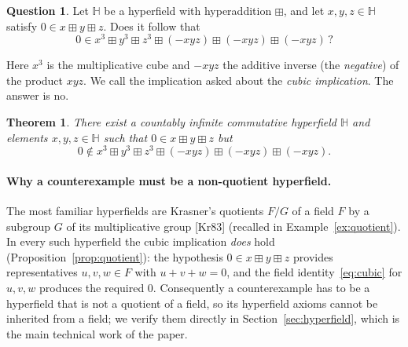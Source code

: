 \documentclass[12pt]{article}
\theoremstyle{plain}
\newtheorem{theorem}{Theorem}[section]
\theoremstyle{definition}
\newtheorem*{question}{Question}
\newcommand{\Hh}{\mathbb{H}}
\newcommand{\bp}{\boxplus}
\begin{document}
\begin{question}
Let $\Hh$ be a hyperfield with hyperaddition $\bp$, and let
$x,y,z\in\Hh$ satisfy $0\in x\bp y\bp z$.  Does it follow that
\[
 0\in x^3\bp y^3\bp z^3\bp(-xyz)\bp(-xyz)\bp(-xyz)\,?
\]
\end{question}

\noindent
Here $x^3$ is the multiplicative cube and $-xyz$ the additive inverse
(the \emph{negative}) of the product $xyz$.  We call the implication
asked about the \emph{cubic implication}.  The answer is no.

\begin{theorem}\label{thm:main}
There exist a countably infinite commutative hyperfield $\Hh$ and
elements $x,y,z\in\Hh$ such that $0\in x\bp y\bp z$ but
\[
 0\notin x^3\bp y^3\bp z^3\bp(-xyz)\bp(-xyz)\bp(-xyz).
\]
\end{theorem}

\paragraph{Why a counterexample must be a non-quotient hyperfield.}
The most familiar hyperfields are Krasner's quotients $F/G$ of a field
$F$ by a subgroup $G$ of its multiplicative group
[Kr83] (recalled in Example~\ref{ex:quotient}).  In every such hyperfield the cubic
implication \emph{does} hold (Proposition~\ref{prop:quotient}): the
hypothesis $0\in x\bp y\bp z$ provides representatives $u,v,w\in F$
with $u+v+w=0$, and the field identity~\eqref{eq:cubic} for $u,v,w$
produces the required $0$.  Consequently a counterexample has to be a
hyperfield that is not a quotient of a field, so its hyperfield axioms
cannot be inherited from a field; we verify them directly in
Section~\ref{sec:hyperfield}, which is the main technical work of the
paper.
\end{document}
